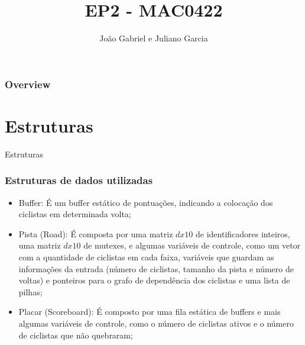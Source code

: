 \documentclass{beamer}
\title[EP1]{EP2 - MAC0422} %
\author{João Gabriel e Juliano Garcia} %
\institute[IME- USP] %
{
Instituto de Matemática e Estatística - USP \\ %
}
\date{} %
\begin{document}
\begin{frame}
\titlepage %
\end{frame}

\begin{frame}
\frametitle{Overview} %
\tableofcontents %
\end{frame}


\section{Estruturas}

\begin{frame}
\begin{center}
\huge Estruturas
\end{center}
\end{frame}

\begin{frame}
\frametitle{Estruturas de dados utilizadas}
\begin{itemize}
\item Buffer: É um buffer estático de pontuações, indicando a colocação dos ciclistas em determinada volta;
\item Pista (Road): É composta por uma matriz $dx10$ de identificadores inteiros, uma matriz $dx10$ de mutexes, e algumas variáveis de controle, como um vetor com a quantidade de ciclistas em cada faixa, variáveis que guardam as informações da entrada (número de ciclistas, tamanho da pista e número de voltas) e ponteiros para o grafo de dependência dos ciclistas e uma lista de pilhas;
\item Placar (Scoreboard): É composto por uma fila estática de buffers e mais algumas variáveis de controle, como o número de ciclistas ativos e o número de ciclistas que não quebraram;
\end{itemize}
\end{frame}
\end{document}
